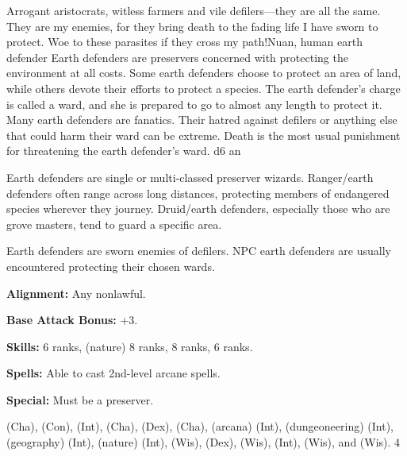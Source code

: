 {Arrogant aristocrats, witless farmers and vile defilers---they are all the same. They are my enemies, for they bring death to the fading life I have sworn to protect. Woe to these parasites if they cross my path!}{Nuan, human earth defender}
{Earth defenders are preservers concerned with protecting the environment at all costs. Some earth defenders choose to protect an area of land, while others devote their efforts to protect a species. The earth defender's charge is called a ward, and she is prepared to go to almost any length to protect it. Many earth defenders are fanatics. Their hatred against defilers or anything else that could harm their ward can be extreme. Death is the most usual punishment for threatening the earth defender's ward.}
{d6}
{an}
{
Earth defenders are single or multi-classed preserver wizards. Ranger/earth defenders often range across long distances, protecting members of endangered species wherever they journey. Druid/earth defenders, especially those who are grove masters, tend to guard a specific area.

Earth defenders are sworn enemies of defilers. NPC earth defenders are usually encountered protecting their chosen wards.
}
{
\textbf{Alignment:} Any nonlawful.

\textbf{Base Attack Bonus:} +3.

\textbf{Skills:}  6 ranks,  (nature) 8 ranks,  8 ranks,  6 ranks.

\textbf{Spells:} Able to cast 2nd-level arcane spells.

\textbf{Special:} Must be a preserver.
}
{ (Cha),  (Con),  (Int),  (Cha),  (Dex),  (Cha),  (arcana) (Int),  (dungeoneering) (Int),  (geography) (Int),  (nature) (Int),  (Wis),  (Dex),  (Wis),  (Int),  (Wis), and  (Wis).}
{4}
